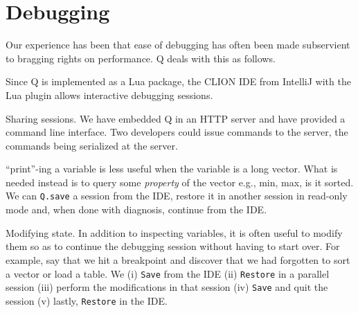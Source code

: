 \section{Debugging}
\label{Debugging}

Our experience has been that ease of debugging has often been made
subservient to bragging rights on performance. Q deals with this as follows.

\be
\item 
Since Q is implemented as a Lua package, the CLION IDE from IntelliJ 
with the Lua plugin allows interactive debugging sessions. 
\item Sharing sessions. 
We have embedded Q in an HTTP server and have provided a command line
interface.
Two
developers could issue commands to the server, the commands being serialized at the
server. 
\item ``print''-ing a variable is less useful when the variable is a long
  vector. What is needed instead is 
to query some {\it property} of the vector e.g., min, max, is it sorted. 
We can {\tt Q.save} a session from the IDE, restore it in another session in
read-only mode and, when done with diagnosis, continue from the IDE.
\item Modifying state. In addition to inspecting variables, it is often useful
  to modify them so as to continue the debugging session without having to
  start over. For example, say that we hit a breakpoint and discover  
  that we had forgotten to sort a vector or load a table. We 
  (i) {\tt Save} from the IDE
  (ii) {\tt Restore} in a parallel session 
  (iii) perform the modifications in that session 
  (iv) {\tt Save} and quit the session 
  (v) lastly, {\tt Restore} in the IDE.

\ee
